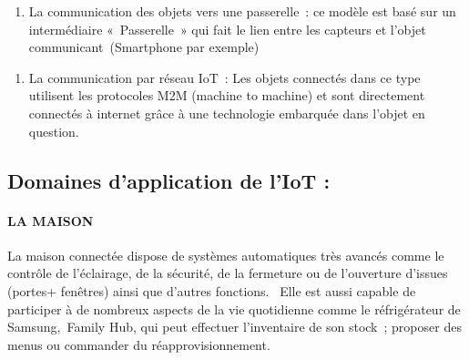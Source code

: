 \documentclass[12pt,a4paper]{report}
\begin{document}
\noindent \begin{flushleft}
	
\end{flushleft}

\begin{enumerate}
	\item  La communication des objets vers une passerelle~: ce mod\`{e}le est bas\'{e} sur un interm\'{e}diaire «~Passerelle~» qui fait le lien entre les capteurs et l'objet communicant~(Smartphone par exemple)
\end{enumerate}

\noindent \begin{flushleft}
	
\end{flushleft}

\begin{enumerate}
	\item  La communication par r\'{e}seau IoT~: Les objets connect\'{e}s dans ce type utilisent les protocoles M2M (machine to machine) et sont directement connect\'{e}s \`{a} internet gr\^{a}ce \`{a} une technologie embarqu\'{e}e dans l'objet en question.
\end{enumerate}

\noindent \begin{flushleft}
	
	
	\noindent 
	
	\noindent 
	
	\noindent 
	
	\noindent 
	
	\noindent 
	
	\noindent 
	
	\noindent 
	
	\subsection{Domaines d'application de l'IoT :}
	\noindent 
\end{flushleft}

\noindent 
\paragraph{LA MAISON}

\noindent \begin{flushleft}
	La maison connect\'{e}e dispose de syst\`{e}mes automatiques tr\`{e}s avanc\'{e}s comme le contr\^{o}le de l'\'{e}clairage, de la s\'{e}curit\'{e}, de la fermeture ou de l'ouverture d'issues (portes+ fen\^{e}tres) ainsi que d'autres fonctions.~ Elle est aussi capable de participer \`{a} de nombreux aspects de la vie quotidienne comme le r\'{e}frig\'{e}rateur de Samsung,~Family Hub, qui peut effectuer l'inventaire de son stock~; proposer des menus ou commander du r\'{e}approvisionnement.
	
	\noindent ~
\end{flushleft}
\end{document}

